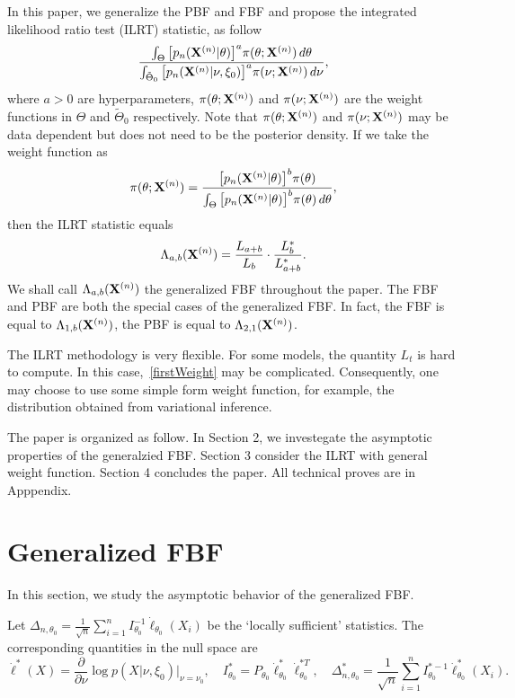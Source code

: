 \documentclass[3p]{elsarticle}
\theoremstyle{plain}
\theoremstyle{definition}
\theoremstyle{remark}
\begin{document}
 In this paper, we generalize the PBF and FBF and propose the integrated likelihood ratio test (ILRT) statistic, as follow  
\begin{equation}
    \frac{\int_{\Theta} \big[p_n(\mathbf{X}^{(n)}|\theta)\big]^{a}\pi(\theta;\mathbf{X}^{(n)})\,d\theta}{\int_{\tilde{\Theta}_0} \big[p_n(\mathbf{X}^{(n)}|\nu,\xi_0)\big]^{a}\pi(\nu;\mathbf{X}^{(n)})\,d\nu},
\end{equation}
where $a>0$ are  hyperparameters,
 $\pi(\theta;\mathbf{X}^{(n)})$ and $\pi(\nu;\mathbf{X}^{(n)})$ are the weight functions in $\Theta$ and $\tilde{\Theta}_0$ respectively.
Note that $\pi(\theta;\mathbf{X}^{(n)})$ and $\pi(\nu;\mathbf{X}^{(n)})$ may be data dependent but does not need to be the posterior density.
If we take the weight function as
\begin{equation}\label{firstWeight}
\pi(\theta;\mathbf{X}^{(n)})=\frac{\big[p_n(\mathbf{X}^{(n)}|\theta)\big]^b \pi(\theta)}{\int_{\Theta}\big[p_n(\mathbf{X}^{(n)}|\theta)\big]^b \pi(\theta)\, d\theta},
\end{equation}
then the ILRT statistic equals 
$$
    \Lambda_{a,b}(\mathbf{X}^{(n)})=
    \frac{L_{a+b}}{L_{b}}\cdot \frac{L_{b}^*}{L_{a+b}^*}.
$$
We shall call $\Lambda_{a,b}(\mathbf{X}^{(n)})$ the generalized FBF throughout the paper.
The FBF and PBF are both the special cases of the generalized FBF.
In fact, the FBF is equal to $\Lambda_{1,b}(\mathbf{X}^{(n)})$, the PBF is equal to $\Lambda_{2,1}(\mathbf{X}^{(n)})$.

The ILRT methodology is very flexible.
For some models, the quantity $L_t$ is hard to compute.
In this case,~\eqref{firstWeight} may be complicated.
Consequently, one may choose to use some simple form weight function, for example, the distribution obtained from variational inference.


The paper is organized as follow.
In Section 2, we investegate the asymptotic properties of the generalzied FBF.
Section 3 consider the ILRT with general weight function.
Section 4 concludes the paper.
All technical proves are in Apppendix.


\section{Generalized FBF}
In this section, we study the asymptotic behavior of the generalized FBF.

Let $\Delta_{n,\theta_0}=\frac{1}{\sqrt{n}}\sum_{i=1}^n I_{\theta_0}^{-1}\dot{\ell}_{\theta_0}(X_i)$ be the `locally sufficient' statistics.
The corresponding quantities in the null space are 
$$\dot{\ell}^*(X)=\frac{\partial}{\partial \nu}\log p(X|\nu,\xi_0)\Big|_{\nu=\nu_0}, \quad I^*_{\theta_0}=P_{\theta_0}\dot{\ell}_{\theta_0}^*\dot{\ell}_{\theta_0}^{*T},\quad \Delta_{n,\theta_0}^*
=\frac{1}{\sqrt{n}}\sum_{i=1}^n I_{\theta_0}^{*-1}\dot{\ell}^{*}_{\theta_0}(X_i).
$$
\end{document}
